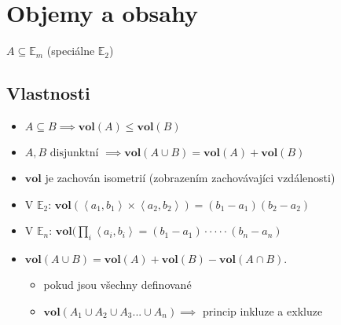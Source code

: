 \documentclass[../main.tex]{subfiles}
\begin{document}
\section{Objemy a obsahy}
\hspace{1.2mm}
$A \subseteq \mathbb{E}_m$ (speciálne $\mathbb{E}_2$)
\noindent

\subsection{Vlastnosti}
\begin{itemize}
    \item $A \subseteq B \implies \mathbf{vol}(A) \leq \mathbf{vol}(B)$
    \item $A, B \text{ disjunktní } \implies \mathbf{vol}(A \cup B) = \mathbf{vol}(A) + \mathbf{vol}(B)$
		\item $\mathbf{vol}$ je zachován isometrií (zobrazením zachovávajíci vzdálenosti)
    \item V $\mathbb{E}_2$: $\mathbf{vol}(\left<a_1,b_1\right>\times \left<a_2,b_2\right>) = (b_1 - a_1)(b_2 - a_2)$
    \item V $\mathbb{E}_n$: $\mathbf{vol}(\prod_i \left<a_i,b_i\right> = (b_1 - a_1) \cdot \cdot \cdot \cdot \cdot (b_n-a_n)$
		\item $\mathbf{vol}(A \cup B) = \mathbf{vol}(A)+\mathbf{vol}(B)-\mathbf{vol}(A \cap B).$
		\begin{itemize}
			\item pokud jsou všechny definované
			\item $\textbf{vol}(A_1\cup A_2\cup A_3...\cup A_n) \implies$ princip inkluze a exkluze
		\end{itemize}
\end{itemize}
\end{document}
